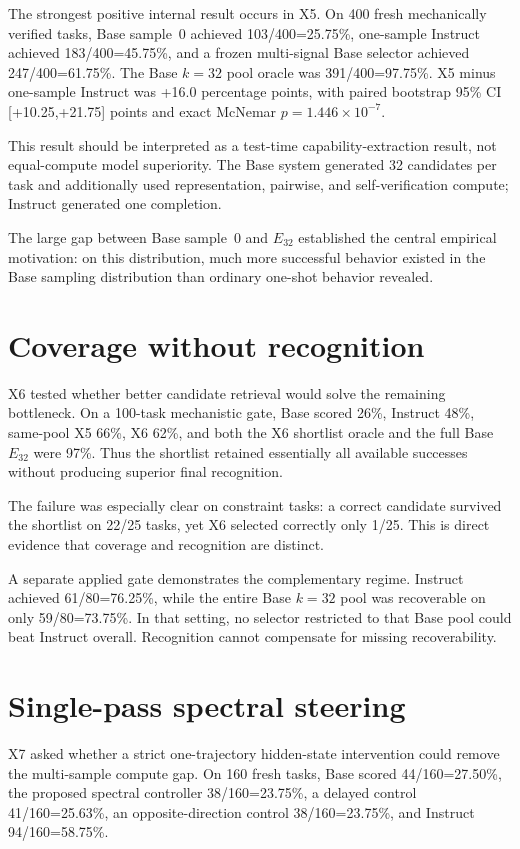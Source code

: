 \documentclass[11pt]{article}
\begin{document}
The strongest positive internal result occurs in X5. On 400 fresh mechanically verified tasks, Base sample~0 achieved 103/400=25.75\%, one-sample Instruct achieved 183/400=45.75\%, and a frozen multi-signal Base selector achieved 247/400=61.75\%. The Base $k=32$ pool oracle was 391/400=97.75\%. X5 minus one-sample Instruct was +16.0 percentage points, with paired bootstrap 95\% CI [+10.25,+21.75] points and exact McNemar $p=1.446\times10^{-7}$.

This result should be interpreted as a test-time capability-extraction result, not equal-compute model superiority. The Base system generated 32 candidates per task and additionally used representation, pairwise, and self-verification compute; Instruct generated one completion.

The large gap between Base sample~0 and $E_{32}$ established the central empirical motivation: on this distribution, much more successful behavior existed in the Base sampling distribution than ordinary one-shot behavior revealed.

\section{Coverage without recognition}

X6 tested whether better candidate retrieval would solve the remaining bottleneck. On a 100-task mechanistic gate, Base scored 26\%, Instruct 48\%, same-pool X5 66\%, X6 62\%, and both the X6 shortlist oracle and the full Base $E_{32}$ were 97\%. Thus the shortlist retained essentially all available successes without producing superior final recognition.

The failure was especially clear on constraint tasks: a correct candidate survived the shortlist on 22/25 tasks, yet X6 selected correctly only 1/25. This is direct evidence that coverage and recognition are distinct.

A separate applied gate demonstrates the complementary regime. Instruct achieved 61/80=76.25\%, while the entire Base $k=32$ pool was recoverable on only 59/80=73.75\%. In that setting, no selector restricted to that Base pool could beat Instruct overall. Recognition cannot compensate for missing recoverability.

\section{Single-pass spectral steering}

X7 asked whether a strict one-trajectory hidden-state intervention could remove the multi-sample compute gap. On 160 fresh tasks, Base scored 44/160=27.50\%, the proposed spectral controller 38/160=23.75\%, a delayed control 41/160=25.63\%, an opposite-direction control 38/160=23.75\%, and Instruct 94/160=58.75\%.
\end{document}
